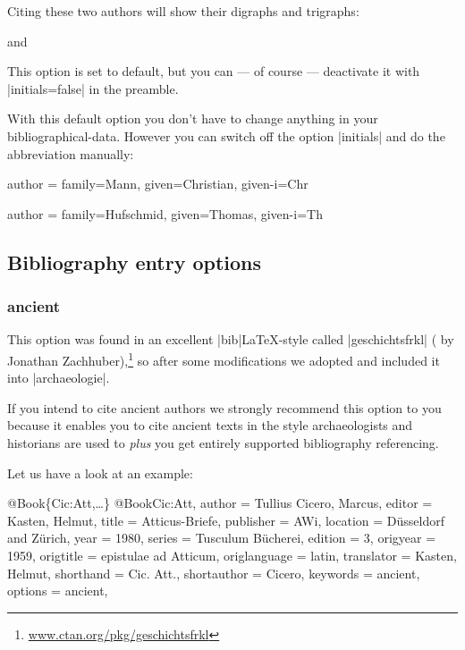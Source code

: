 \documentclass[a4paper,
10pt,
greek,
french,
spanish,
italian,
ngerman,
english,
]{ltxdoc}
\begin{document}
Citing these two authors will show their digraphs and trigraphs:

\begin{example}
\citeauthor{Mann2011} and \citeauthor{Hufschmid2010}
\end{example}



This option is set to default, but you can --- of course --- deactivate it with |initials=false| in the preamble.

With this default option you don’t have to change anything in your bibliographical-data.
However  you can switch off the option |initials| and do the abbreviation manually:

\begin{code}
author = {family=Mann, given=Christian, given-i={Chr}}

author = {family=Hufschmid, given=Thomas, given-i={Th}}
\end{code}


\subsection{Bibliography entry options}\label{options-bibentry}
\subsubsection{ancient}\label{ancient}
This option was found in an excellent |bib|\LaTeX-style called  |geschichtsfrkl| ( by Jonathan Zachhuber),\footnote{\href{https://www.ctan.org/pkg/geschichtsfrkl}{www.ctan.org/pkg/geschichtsfrkl}} 
so after some modifications we adopted and included it into |archaeologie|.
 
If you intend to cite ancient authors we strongly recommend this option to you 
because it enables you to cite ancient texts in the style archaeologists and 
historians are used to \emph{plus} you get entirely supported bibliography referencing.

Let us have a look at an example:
\begin{bibexample}[label=Cic:Att]{{@}Book\{Cic:Att,…\}}
@Book{Cic:Att,
  author       = {Tullius Cicero, Marcus},
  editor       = {Kasten, Helmut},
  title        = {Atticus-Briefe},
  publisher    = AWi,   %
  location     = {Düsseldorf and Zürich},
  year         = {1980},
  series       = {Tusculum Bücherei},
  edition      = {3},
  origyear     = {1959},
  origtitle    = {epistulae ad Atticum},
  origlanguage = {latin},
  translator   = {Kasten, Helmut},
  shorthand    = {Cic. Att.},
  shortauthor  = {Cicero},
  keywords     = {ancient},
  options      = {ancient}, %
}
\end{bibexample}
\end{document}
